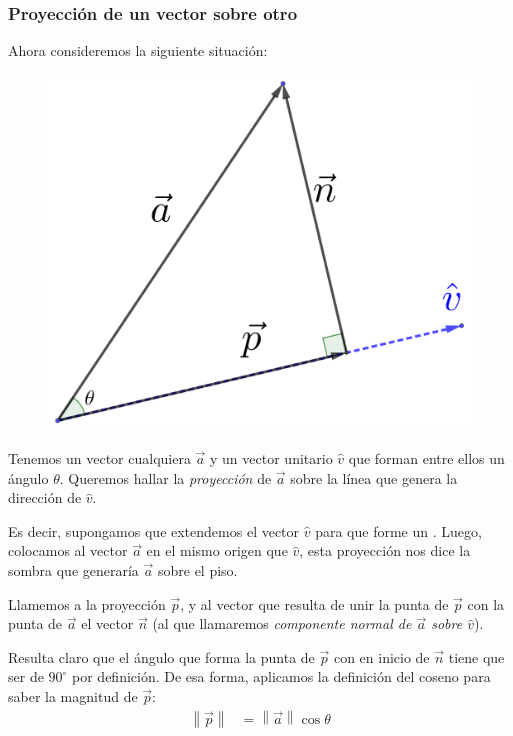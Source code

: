 \documentclass[12pt, fleqn]{report}                             %
\newcommand \Quote {\qq}                                        %
\theoremstyle{break}                                            %
\newcommand{\Abs}[1]{\left\lVert #1 \right\lVert}               %
\begin{document}
            \subsubsection{Proyección de un vector sobre otro}
            
            Ahora consideremos la siguiente situación:
            
            \begin{figure}[H]
                \centering
                \includegraphics[scale=1.1]{vectorProyection.png}
            \end{figure}
        
            Tenemos un vector cualquiera $\vec{a}$ y un vector unitario $\hat{v}$ que forman entre ellos un ángulo $\theta$. Queremos hallar la \emph{proyección} de $\vec{a}$ sobre la línea que genera la dirección de $\hat{v}$.
            
            Es decir, supongamos que extendemos el vector $\hat{v}$ para que forme un \Quote{piso}. Luego, colocamos al vector $\vec{a}$ en el mismo origen que $\hat{v}$, esta proyección nos dice la sombra que generaría $\vec{a}$ sobre el piso.
            
            Llamemos a la proyección $\vec{p}$, y al vector que resulta de unir la punta de $\vec{p}$ con la punta de $\vec{a}$ el vector $\vec{n}$ (al que llamaremos \emph{componente normal de $\vec{a}$ sobre $\hat{v}$}).
            
            Resulta claro que el ángulo que forma la punta de $\vec{p}$ con en inicio de $\vec{n}$ tiene que ser de $90^\circ$ por definición. De esa forma, aplicamos la definición del coseno para saber la magnitud de $\vec{p}$:
            \begin{align}
                {\Abs{\vec{p}}} &= \Abs{\vec{a}} \cos \theta
            \end{align}
        
\end{document}
